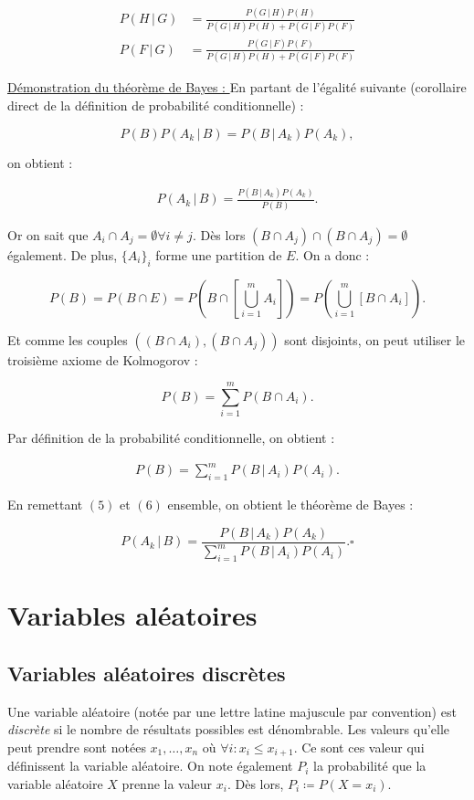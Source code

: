 \documentclass{article}
\begin{document}
		\begin{align}
			P(H \, | \, G) &= \frac {P(G \, | \, H)P(H)}{P(G \, | \, H)P(H) + P(G \, | \, F)P(F)} \\
			P(F \, | \, G) &= \frac {P(G \, | \, F)P(F)}{P(G \, | \, H)P(H) + P(G \, | \, F)P(F)}
		\end{align}

		\underline{Démonstration du théorème de Bayes : } En partant de l'égalité suivante (corollaire direct de la définition de probabilité conditionnelle) :

		\[P(B)P(A_k \, | \, B) = P(B \, | \, A_k)P(A_k),\]

		on obtient :

		\begin{align}
			P(A_k \, | \, B) = \frac {P(B \, | \, A_k)P(A_k)}{P(B)}.
		\end{align}

		Or on sait que $A_i \cap A_j = \emptyset \forall i \neq j$. Dès lors $(B \cap A_j) \cap (B \cap A_j) = \emptyset$ également. De plus, $\{A_i\}_i$ forme une partition de
		$E$. On a donc :

		\[P(B) = P(B \cap E) = P\left(B \cap \left[\bigcup_{i=1}^mA_i\right]\right) = P\left(\bigcup_{i=1}^m[B \cap A_i]\right).\]

		Et comme les couples $((B \cap A_i), (B \cap A_j))$ sont disjoints, on peut utiliser le troisième axiome de Kolmogorov :

		\[P(B) = \sum_{i=1}^mP(B \cap A_i).\]

		Par définition de la probabilité conditionnelle, on obtient :

		\begin{align}
			P(B) = \sum_{i=1}^mP(B \, | \, A_i)P(A_i).
		\end{align}

		En remettant $(5)$ et $(6)$ ensemble, on obtient le théorème de Bayes :

		\[P(A_k \, | \, B) = \frac {P(B \, | \, A_k)P(A_k)}{\sum_{i=1}^mP(B \, | \, A_i)P(A_i)}. \square\]

\section{Variables aléatoires}
	\subsection{Variables aléatoires discrètes}
		Une variable aléatoire (notée par une lettre latine majuscule par convention) est \textit{discrète} si le nombre de résultats possibles est dénombrable. Les valeurs
		qu'elle peut prendre sont notées $x_1, \ldots, x_n$ où $\forall i : x_i \leq x_{i+1}$. Ce sont ces valeur qui définissent la variable aléatoire. On note également
		$P_i$ la probabilité que la variable aléatoire $X$ prenne la valeur $x_i$. Dès lors, $P_i \coloneqq P(X = x_i)$.
\end{document}
